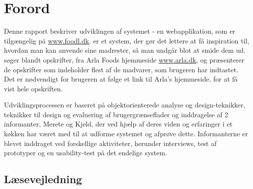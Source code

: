 \chapter*{Forord}
Denne rapport beskriver udviklingen af systemet \Foodl{} - en webapplikation, som er tilgængelig på \url{www.foodl.dk}. \Foodl{} er et system, der gør det lettere at få inspiration til, hvordan man kan anvende sine madrester, så man undgår blot at smide dem ud. \Foodl{} søger blandt opskrifter, fra Arla Foods hjemmeside \url{www.arla.dk}, og præsenterer de opskrifter som indeholder flest af de madvarer, som brugeren har indtastet. Det er nødvendigt for brugeren at følge et link til Arla's hjemmeside, for at få vist hele opskriften.

Udviklingsprocessen er baseret på objektorienterede analyse og design-teknikker\cite{ooad}, teknikker til design og evaluering af brugergrænseflader\cite{deb} og inddragelse af 2 informanter, Merete og Kjeld, der ved hjælp af deres viden og erfaringer i et køkken har været med til at udforme systemet og afprøve dette. Informanterne er blevet inddraget ved forskellige aktiviteter, herunder interviews, test af prototyper og en usability-test på det endelige system.

\section*{Læsevejledning}
